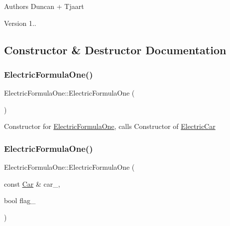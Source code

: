 \begin{DoxyAuthor}{Authors}
Duncan + Tjaart 
\end{DoxyAuthor}
\begin{DoxyVersion}{Version}
1.. 
\end{DoxyVersion}


\subsection{Constructor \& Destructor Documentation}
\mbox{\label{class_electric_formula_one_a4c18ff978aba7c2ce7f6df0bd8c4a8f4}} 
\subsubsection{\texorpdfstring{Electric\+Formula\+One()}{ElectricFormulaOne()}\hspace{0.1cm}{\footnotesize\ttfamily [1/2]}}
{\footnotesize\ttfamily Electric\+Formula\+One\+::\+Electric\+Formula\+One (\begin{DoxyParamCaption}{ }\end{DoxyParamCaption})\hspace{0.3cm}{\ttfamily [inline]}}

Constructor for \mbox{\hyperlink{class_electric_formula_one}{Electric\+Formula\+One}}, calls Constructor of \mbox{\hyperlink{class_electric_car}{Electric\+Car}} \mbox{\label{class_electric_formula_one_a5aeecfb047d062d7757f84ddc720e1b0}} 
\subsubsection{\texorpdfstring{Electric\+Formula\+One()}{ElectricFormulaOne()}\hspace{0.1cm}{\footnotesize\ttfamily [2/2]}}
{\footnotesize\ttfamily Electric\+Formula\+One\+::\+Electric\+Formula\+One (\begin{DoxyParamCaption}\item[{const \mbox{\hyperlink{class_car}{Car}} \&}]{car\+\_\+,  }\item[{bool}]{flag\+\_\+ }\end{DoxyParamCaption})\hspace{0.3cm}{\ttfamily [inline]}}

